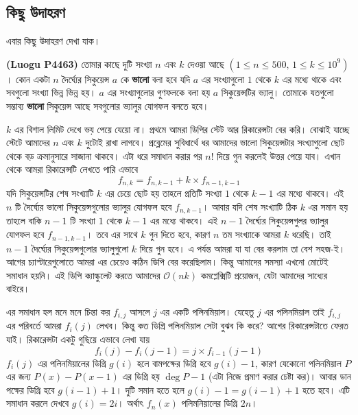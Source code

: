 \subsection{কিছু উদাহরণ}
এবার কিছু উদাহরণ দেখা যাক। 
\begin{problem} \textbf{(Luogu P4463)} তোমার কাছে দুটি সংখ্যা $n$  এবং $k$ দেওয়া আছে $(1 \leq n \leq 500, \, 1 \leq k \leq 10^9)$।  কোন একটা $n$ দৈর্ঘ্যের সিকুয়েন্স $a$ কে \textbf{ভালো} বলা হবে যদি $a$ এর সংখ্যাগুলো $1$ থেকে $k$ এর মধ্যে থাকে এবং সবগুলো সংখ্যা ভিন্ন ভিন্ন হয়। $a$ এর সংখ্যাগুলোর গুণফলকে বলা হয় $a$ সিকুয়েন্সটির ভ্যালু। তোমাকে যতগুলো সম্ভাব্য \textbf{ভালো} সিকুয়েন্স আছে সবগুলোর ভ্যালুর যোগফল বলতে হবে। 
\end{problem}
\begin{solution}
$k$ এর বিশাল লিমিট দেখে ভয় পেয়ে যেয়ো না। প্রথমে আমরা ডিপির স্টেট আর রিকারেন্সটা বের করি। বোঝাই যাচ্ছে স্টেটে আমাদের $n$ এবং $k$ দুটোই রাখা লাগবে। প্রব্লেমের সুবিধার্থে ধর আমাদের ভালো সিকুয়েন্সটার সংখ্যাগুলো ছোট থেকে বড় ক্রমানুসারে সাজানা থাকবে। এটা ধরে সমাধান করার পর $n!$ দিয়ে গুন করলেই উত্তর পেয়ে যাব। এখান থেকে আমরা রিকারেন্সটি লেখতে পারি এভাবে 
$$f_{n, k} = f_{n, k - 1} + k \times f_{n - 1, k - 1}$$
যদি সিকুয়েন্সটির শেষ সংখ্যাটি $k$ এর চেয়ে ছোট হয় তাহলে প্রতিটি সংখ্যা $1$ থেকে $k - 1$ এর মধ্যে থাকবে। এই $n$ টি দৈর্ঘ্যের ভালো সিকুয়েন্সগুলোর ভ্যালুর যোগফল হবে $f_{n, k - 1}$। আবার যদি শেষ সংখ্যাটি ঠিক $k$ এর সমান হয় তাহলে বাকি $n - 1$ টি সংখ্যা $1$  থেকে $k - 1$ এর মধ্যে থাকবে। এই $n - 1$ দৈর্ঘ্যের সিকুয়েন্সগুলর ভ্যালুর যোগফল হবে $f_{n - 1, k - 1}$।  তবে এর সাথে $k$ গুন দিতে হবে, কারণ $n$ তম সংখ্যাকে আমরা $k$ ধরেছি। তাই $n - 1$ দৈর্ঘ্যের সিকুয়েন্সগুলোর ভ্যালুগুলো $k$ দিয়ে গুন হবে। 
এ পর্যন্ত আমরা যা যা বের করলাম তা বেশ সহজ-ই। আগের চ্যাপ্টারেগুলোতে আমরা এর চেয়েও কঠিন ডিপি বের করেছিলাম। কিন্তু আমাদের সমস্যা এখনো মোটেই সমাধান হয়নি। এই ডিপি ক্যাল্কুলেট করতে আমাদের $\mathcal{O}(nk)$ কমপ্লেক্সিটি প্রয়োজন, যেটা আমাদের সাধ্যের বাইরে। 

এর সমাধান হল মনে মনে চিন্তা কর $f_{i, j}$ আসলে $j$ এর একটি পলিনমিয়াল। যেহেতু $j$ এর পলিনমিয়াল তাই $f_{i, j}$ এর পরিবর্তে আমরা $f_{i}(j)$ লেখব। কিন্তু কত ডিগ্রি পলিনমিয়াল সেটা বুঝব কি করে? আগের রিকারেন্সটাতে ফেরত যাই। রিকারেন্সটা একটু গুছিয়ে এভাবে লেখা যায় 
 $$f_{i}(j) - f_{i}(j - 1) = j \times f_{i - 1}(j - 1)$$
$f_{i}(j)$ এর পলিনমিয়ালের ডিগ্রি $g(i)$ হলে বামপক্ষের ডিগ্রি হবে $g(i) - 1$, কারণ যেকোনো পলিনমিয়াল $P$ এর জন্য $P(x) - P(x - 1)$ এর ডিগ্রি হয় $\deg{P} - 1$ (এটা নিজে প্রমাণ করার চেষ্টা কর)। আবার ডান পক্ষের ডিগ্রি হবে $g(i - 1) + 1$।  দুটি সমান হতে হলে $g(i) - 1 = g(i - 1) + 1$ হতে হবে। এটি সমাধান করলে দেখবে $g(i) = 2i$। অর্থাৎ $f_{n}(x)$ পলিমনিয়ালের ডিগ্রি $2n$।


\end{solution}

